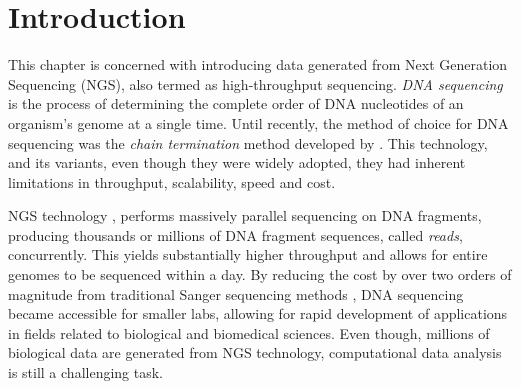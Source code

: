 \section{Introduction} \label{data-intro-sect}
This chapter is concerned with introducing data generated from Next Generation Sequencing (NGS), also termed as high-throughput sequencing. \emph{DNA sequencing} is the process of determining the complete order of DNA nucleotides of an organism's genome at a single time. Until recently, the method of choice for DNA sequencing was the \emph{chain termination} method developed by \citet{Sanger1977}. This technology, and its variants, even though they were widely adopted, they had inherent limitations in throughput, scalability, speed and cost. 

NGS technology \citep{Shendure2008, Mardis2008}, performs massively parallel sequencing on DNA fragments, producing thousands or millions of DNA fragment sequences, called \emph{reads}, concurrently. This yields substantially higher throughput and allows for entire genomes to be sequenced within a day. By reducing the cost by over two orders of magnitude from traditional Sanger sequencing methods \citep{Shendure2008}, DNA sequencing became accessible for smaller labs, allowing for rapid development of applications in fields related to biological and biomedical sciences. Even though, millions of biological data are generated from NGS technology, computational data analysis is still a challenging task.